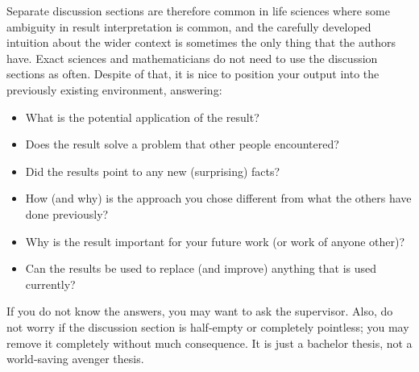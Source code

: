 Separate discussion sections are therefore common in life sciences where some ambiguity in result interpretation is common, and the carefully developed intuition about the wider context is sometimes the only thing that the authors have. Exact sciences and mathematicians do not need to use the discussion sections as often. Despite of that, it is nice to position your output into the previously existing environment, answering:
\begin{itemize}
\item What is the potential application of the result?
\item Does the result solve a problem that other people encountered?
\item Did the results point to any new (surprising) facts?
\item How (and why) is the approach you chose different from what the others have done previously?
\item Why is the result important for your future work (or work of anyone other)?
\item Can the results be used to replace (and improve) anything that is used currently?
\end{itemize}

If you do not know the answers, you may want to ask the supervisor. Also, do not worry if the discussion section is half-empty or completely pointless; you may remove it completely without much consequence. It is just a bachelor thesis, not a world-saving avenger thesis.
